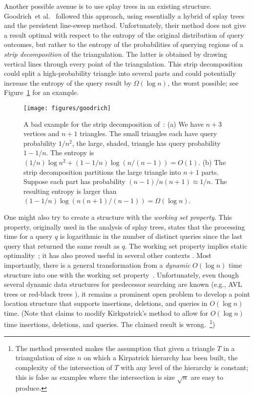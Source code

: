 \documentclass[11pt]{article}
\newcommand{\etal}{et al.}
\begin{document}
Another possible avenue is to use splay trees in an
existing structure. Goodrich~\etal~\cite{goodrich2} followed this approach,
using essentially a hybrid of splay trees and the persistent line-sweep
method. Unfortunately, their method does not give a result
optimal with respect to the entropy of the original distribution of
query outcomes,
but rather to the entropy of the probabilities of querying
regions of a \emph{strip decomposition} of the triangulation. 
The latter is obtained
by drawing vertical lines through every point of the triangulation. 
This strip decomposition could split a high-probability triangle 
into several parts
and could potentially increase the entropy of the query result by 
$\Omega(\log n)$, the worst possible; see Figure~\ref{fig:goodrich} 
for an example.
\begin{figure}[ht]
\begin{center}
\texttt{[image: figures/goodrich]}
\end{center}
\caption{A bad example for the strip decomposition of~\cite{goodrich2}: 
(a) We have $n+3$ vertices
and $n+1$ triangles. The small triangles each have query probability
$1/n^2$, the large, shaded, triangle has query probability $1-1/n$.
The entropy is $(1/n)\log n^2 + (1-1/n)\log(n/(n-1)) = O(1)$. 
(b) The strip decomposition partitions the large
triangle into $n+1$ parts. Suppose each part has probability 
$(n-1)/n(n+1) \approx 1/n$. The resulting entropy is
larger than $(1-1/n)\log(n(n+1)/(n-1)) = \Omega(\log n)$.}

\label{fig:goodrich}
\end{figure}

One might also try to create a structure with the 
\emph{working set property}. This property, 
originally used in the analysis of splay
trees, states that the processing time for a query $q$ is logarithmic
in the number
of distinct queries since the last query that returned the same result
as $q$. 
The working set property implies static 
optimality~\cite{Iacono01a}; 
it has also proved useful in several other
contexts \cite{BoseDoDuHo10,Elmasry06,BoseDoLa08,Iacono05,Iacono00}. 
Most importantly, there is a general
transformation from a \emph{dynamic} $O(\log n)$ time 
structure into one with the working
set property~\cite{Iacono01a}. 
Unfortunately, even though several dynamic data structures for 
predecessor searching are known (e.g., AVL trees \cite{avl} or
red-black trees \cite{redblack}), it remains a prominent open problem
to develop a point location structure that supports insertions, deletions,
and queries in $O(\log n)$ time.
(Note that \cite{Talib:1996:TME:792755.792810} claims to modify Kirkpatrick's
method to allow for $O(\log n)$ time insertions, deletions, and queries. The
claimed result is wrong.~\footnote{The method presented makes the assumption 
that given a triangle $T$ in a triangulation of size $n$ on which
a Kirpatrick hierarchy has been built, the complexity of the 
intersection of $T$ with any level of the hierarchy is constant; this is 
false as examples where the intersection is size $\sqrt{n}$ are easy to produce.})
\end{document}
